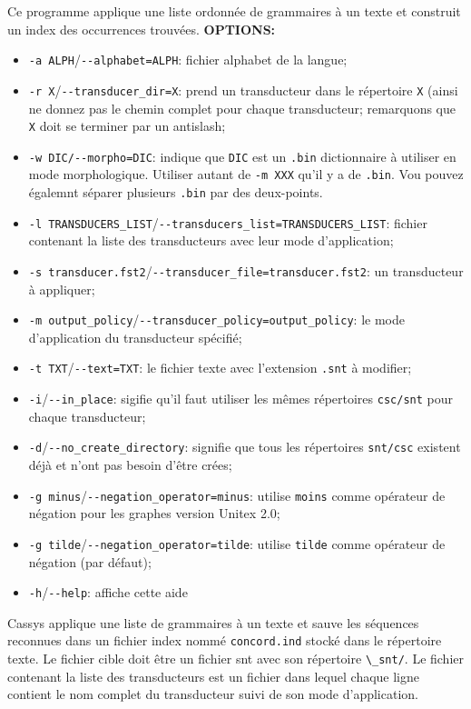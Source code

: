 \bigskip
\noindent Ce programme applique une liste ordonnée de grammaires à un texte et construit un index
des occurrences trouvées.
\bigskip
\noindent \textbf{OPTIONS:}
\begin{itemize}
\item \verb+-a ALPH+/\verb+--alphabet=ALPH+: fichier alphabet de la langue;
\item \verb+-r X+/\verb+--transducer_dir=X+: prend un transducteur dans le répertoire \verb+X+ (ainsi ne
		donnez pas le chemin complet pour chaque transducteur; remarquons que \verb+X+ doit se
		terminer par un antislash;
	\item \verb+-w DIC/--morpho=DIC+: indique que \verb+DIC+ est un \verb+.bin+ dictionnaire à utiliser en mode morphologique.
		Utiliser autant de  \verb+-m XXX+ qu'il y a de \verb+.bin+. Vou pouvez égalemnt séparer plusieurs \verb+.bin+ par des deux-points.

\item \verb+-l TRANSDUCERS_LIST+/\verb+--transducers_list=TRANSDUCERS_LIST+: fichier
		contenant la liste des transducteurs avec leur mode d'application;
\item \verb+-s transducer.fst2+/\verb+--transducer_file=transducer.fst2+: un transducteur à
		appliquer;
\item \verb+-m output_policy+/\verb+--transducer_policy=output_policy+: le mode
		d'application du transducteur spécifié;
\item \verb+-t TXT+/\verb+--text=TXT+: le fichier texte avec l'extension \verb+.snt+ à modifier;
\item \verb+-i+/\verb+--in_place+: sigifie qu'il faut utiliser les mêmes répertoires \verb+csc/snt+
	pour chaque transducteur;
\item \verb+-d+/\verb+--no_create_directory+: signifie que tous les répertoires \verb+snt/csc+
	existent déjà et n'ont pas besoin d'être crées;
\item \verb+-g minus+/\verb+--negation_operator=minus+: utilise \verb+moins+ comme opérateur de
	négation pour les graphes version Unitex 2.0;
\item \verb+-g tilde+/\verb+--negation_operator=tilde+: utilise \verb+tilde+ comme opérateur de
	négation (par défaut);
\item \verb+-h+/\verb+--help+: affiche cette aide
\end{itemize} 	


\bigskip
\noindent Cassys applique une liste de grammaires à un texte et sauve les séquences reconnues dans
un fichier index nommé \verb+concord.ind+ stocké dans le répertoire texte.
Le fichier cible doit être un fichier snt avec son répertoire \verb+\_snt/+. 
Le fichier contenant la liste des transducteurs est un fichier dans lequel chaque ligne contient le
nom complet du transducteur suivi de son mode d'application.

